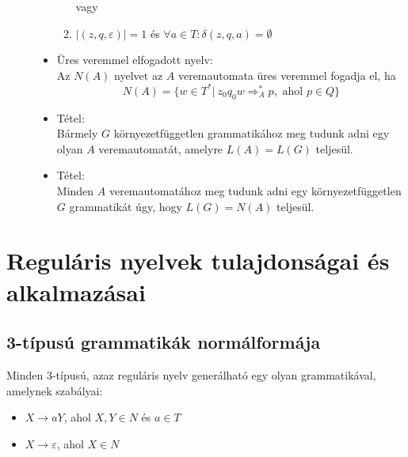 \documentclass[margin=0px]{article}
\begin{document}
\begin{description}
\begin{itemize}
\begin{enumerate}
									vagy
								\item $|(z, q, \varepsilon)| = 1 $ és $\forall a \in T: \delta(z, q, a) = \emptyset$
								\end{enumerate}
							\item Üres veremmel elfogadott nyelv: \\
								Az $N(A)$ nyelvet az $A$ veremautomata üres veremmel fogadja el, ha
								\[ N(A) = \{w \in T^* | \ z_0q_0w \Longrightarrow_A^* p, \textrm{ ahol } p \in Q \} \]
							\item Tétel: \\
								Bármely $G$ környezetfüggetlen grammatikához meg tudunk adni egy olyan $A$ veremautomatát, amelyre $L(A) = L(G)$ teljesül.
							\item Tétel: \\
								Minden $A$ veremautomatához meg tudunk adni egy környezetfüggetlen $G$ grammatikát úgy, hogy $L(G) = N(A)$ teljesül.
						\end{itemize}
			\end{description}
	\section{Reguláris nyelvek tulajdonságai és alkalmazásai}
		\subsection{3-típusú grammatikák normálformája}
			Minden 3-típusú, azaz reguláris nyelv generálható egy olyan grammatikával, amelynek szabályai:
			\begin{itemize}
				\item $ X \rightarrow aY$, ahol $X,Y \in N$ és $a \in T$
				\item $X \rightarrow \varepsilon$, ahol $X \in N$
			\end{itemize}
\end{document}
